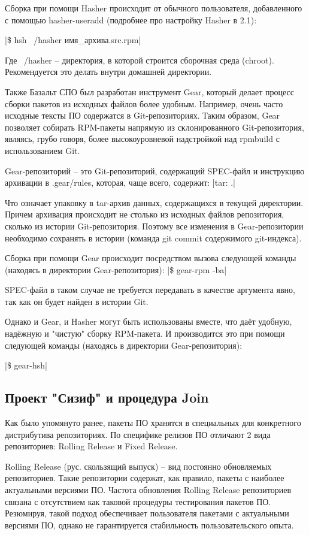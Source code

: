 \documentclass[bachelor, och, pract]{SCWorks}
\begin{document}
Сборка при помощи Hasher происходит от обычного пользователя, добавленного с помощью hasher-useradd (подробнее про настройку Hasher в 2.1):

|\$ hsh ~/hasher имя_архива.src.rpm| %

Где ~/hasher -- директория, в которой строится сборочная среда (chroot). Рекомендуется это делать внутри домашней директории\cite{a_hasher}.

Также Базальт СПО был разработан инструмент Gear, который делает процесс сборки пакетов из исходных файлов более удобным. 
Например, очень часто исходные тексты ПО содержатся в Git-репозиториях.
Таким образом, Gear позволяет собирать RPM-пакеты напрямую из склонированного Git-репозитория, являясь, грубо говоря, более высокоуровневой надстройкой над rpmbuild с использованием Git.

Gear-репозиторий -- это Git-репозиторий, содержащий SPEC-файл и инструкцию архивации в .gear/rules, которая, чаще всего, содержит:
|tar: .|

Что означает упаковку в tar-архив данных, содержащихся в текущей директории.
Причем архивация происходит не столько из исходных файлов репозитория, сколько из истории Git-репозитория. 
Поэтому все изменения в Gear-репозитории необходимо сохранять в истории (команда git commit содержимого git-индекса).

Сборка при помощи Gear происходит посредством вызова следующей команды (находясь в директории Gear-репозитория):
|\$ gear-rpm -ba|

SPEC-файл в таком случае не требуется передавать в качестве аргумента явно, так как он будет найден в истории Git\cite{a_gear}.

Однако и Gear, и Hasher могут быть использованы вместе, что даёт удобную, надёжную и "чистую" сборку RPM-пакета.
И производится это при помощи следующей команды (находясь в директории Gear-репозитория):

|\$ gear-hsh|

\subsection{Проект "Сизиф" и процедура Join}

Как было упомянуто ранее, пакеты ПО хранятся в специальных для конкретного дистрибутива репозиториях.
По специфике релизов ПО отличают 2 вида репозиториев: Rolling Release и Fixed Release.

Rolling Release (рус. скользящий выпуск) -- вид постоянно обновляемых репозиториев.
Такие репозитории содержат, как правило, пакеты с наиболее актуальными версиями ПО.
Частота обновления Rolling Release репозиториев связана с отсутствием как таковой процедуры тестирования пакетов ПО.
Резюмируя, такой подход обеспечивает пользователя пакетами с актуальными версиями ПО, однако не гарантируется стабильность пользовательского опыта.
\end{document}

